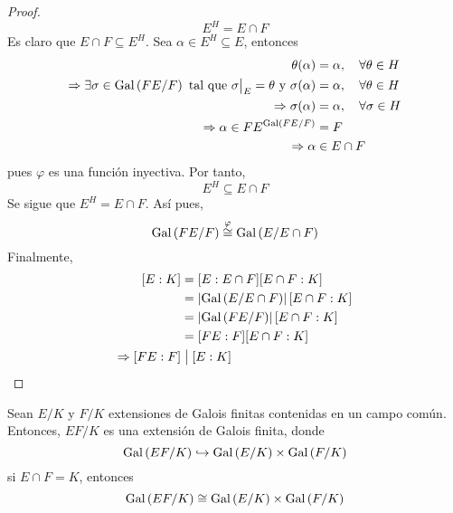 \documentclass[12pt]{report}
\theoremstyle{largebreak}
\newcommand\abs[1]{\ensuremath{\left|#1\right|}}
\newcommand\divides{\ensuremath{\bigm|}}
\begin{document}
\begin{proof}
\begin{equation*}
            E^H=E\cap F
        \end{equation*}
        Es claro que $E\cap F\subseteq E^H$. Sea $\alpha\in E^H\subseteq E$, entonces
        \begin{equation*}
            \begin{split}
                \theta(\alpha)&=\alpha,\quad\forall\theta\in H\\
                \Rightarrow \exists\sigma\in \textup{Gal}\left(FE/F\right)\textup{ tal que }\sigma\big|_E=\theta\textup{ y }\sigma(\alpha)&=\alpha,\quad\forall \theta\in H\\
                \Rightarrow \sigma(\alpha)&=\alpha,\quad\forall\sigma\in H\\
                \Rightarrow \alpha\in FE^{\textup{Gal}\left(FE/F\right)}&=F\\
                \Rightarrow \alpha&\in E\cap F\\
            \end{split}
        \end{equation*}
        pues $\varphi$ es una función inyectiva. Por tanto,
        \begin{equation*}
            E^H\subseteq E\cap F
        \end{equation*}
        Se sigue que $E^H=E\cap F$. Así pues,
        \begin{equation*}
            \textup{Gal}\left(FE/F\right)\overset{\varphi}{\cong}\textup{Gal}\left(E/E\cap F\right)
        \end{equation*}
        Finalmente,
        \begin{equation*}
            \begin{split}
                [E:K]&=[E:E\cap F][E\cap F:K]\\
                &=\abs{\Gal{E/E\cap F}}[E\cap F:K]\\
                &=\abs{\Gal{FE/F}}[E\cap F:K]\\
                &=[FE:F][E\cap F:K]\\
                \Rightarrow [FE:F]&\divides[E:K]\\
            \end{split}
        \end{equation*}
    \end{proof}

    \begin{propo}
        Sean $E/K$ y $F/K$ extensiones de Galois finitas contenidas en un campo común. Entonces, $EF/K$ es una extensión de Galois finita, donde 
        \begin{equation*}
            \textup{Gal}\left(EF/K\right)\hookrightarrow \textup{Gal}\left(E/K\right)\times\textup{Gal}\left(F/K\right) 
        \end{equation*}
        si $E\cap F=K$, entonces
        \begin{equation*}
            \textup{Gal}\left(EF/K\right)\cong\textup{Gal}\left(E/K\right)\times\textup{Gal}\left(F/K\right)
        \end{equation*}
    \end{propo}
\end{document}

